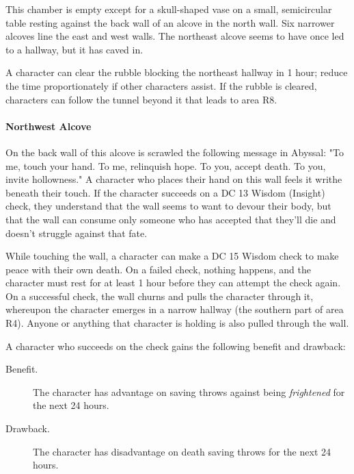 \documentclass[a4paper, 11pt, bg=full, twocolumn, nooutline]{dndbook}
\begin{document}
\begin{DndReadAloud}
This chamber is empty except for a skull-shaped vase on a small, semicircular table resting against the back wall of an alcove in the north wall. Six narrower alcoves line the east and west walls. The northeast alcove seems to have once led to a hallway, but it has caved in.
\end{DndReadAloud}

A character can clear the rubble blocking the northeast hallway in 1 hour; reduce the time proportionately if other characters assist. If the rubble is cleared, characters can follow the tunnel beyond it that leads to area R8.

\paragraph{Northwest Alcove}

On the back wall of this alcove is scrawled the following message in Abyssal: "To me, touch your hand. To me, relinquish hope. To you, accept death. To you, invite hollowness." A character who places their hand on this wall feels it writhe beneath their touch. If the character succeeds on a DC 13 Wisdom (Insight) check, they understand that the wall seems to want to devour their body, but that the wall can consume only someone who has accepted that they'll die and doesn't struggle against that fate.

While touching the wall, a character can make a DC 15 Wisdom check to make peace with their own death. On a failed check, nothing happens, and the character must rest for at least 1 hour before they can attempt the check again. On a successful check, the wall churns and pulls the character through it, whereupon the character emerges in a narrow hallway (the southern part of area R4). Anyone or anything that character is holding is also pulled through the wall.

A character who succeeds on the check gains the following benefit and drawback:

\begin{DndSidebar}{}
\begin{description}
\item[Benefit.] The character has advantage on saving throws against being \textit{frightened} for the next 24 hours.
\item[Drawback.] The character has disadvantage on death saving throws for the next 24 hours.
\end{description}
\end{DndSidebar}
\end{document}
